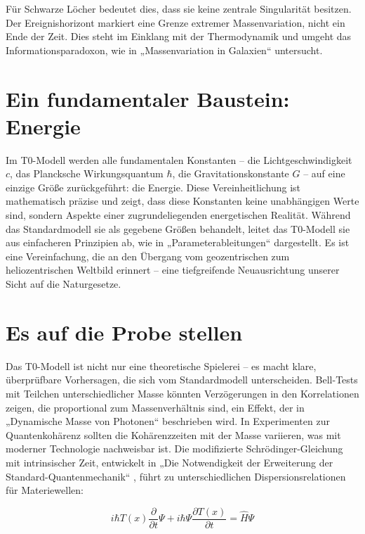 \documentclass[a4paper,12pt]{article}
\newcommand{\Tfield}{T(x)}
\begin{document}
	Für Schwarze Löcher bedeutet dies, dass sie keine zentrale Singularität besitzen. Der Ereignishorizont markiert eine Grenze extremer Massenvariation, nicht ein Ende der Zeit. Dies steht im Einklang mit der Thermodynamik und umgeht das Informationsparadoxon, wie in „Massenvariation in Galaxien“ \cite{pascher_galaxies_2025} untersucht.
	
	\section{Ein fundamentaler Baustein: Energie}
	
	Im T0-Modell werden alle fundamentalen Konstanten – die Lichtgeschwindigkeit \(c\), das Plancksche Wirkungsquantum \(\hbar\), die Gravitationskonstante \(G\) – auf eine einzige Größe zurückgeführt: die Energie. Diese Vereinheitlichung ist mathematisch präzise und zeigt, dass diese Konstanten keine unabhängigen Werte sind, sondern Aspekte einer zugrundeliegenden energetischen Realität. Während das Standardmodell sie als gegebene Größen behandelt, leitet das T0-Modell sie aus einfacheren Prinzipien ab, wie in „Parameterableitungen“ \cite{pascher_params_2025} dargestellt. Es ist eine Vereinfachung, die an den Übergang vom geozentrischen zum heliozentrischen Weltbild erinnert – eine tiefgreifende Neuausrichtung unserer Sicht auf die Naturgesetze.
	
	\section{Es auf die Probe stellen}
	
	Das T0-Modell ist nicht nur eine theoretische Spielerei – es macht klare, überprüfbare Vorhersagen, die sich vom Standardmodell unterscheiden. Bell-Tests mit Teilchen unterschiedlicher Masse könnten Verzögerungen in den Korrelationen zeigen, die proportional zum Massenverhältnis sind, ein Effekt, der in „Dynamische Masse von Photonen“ \cite{pascher_photons_2025} beschrieben wird. In Experimenten zur Quantenkohärenz sollten die Kohärenzzeiten mit der Masse variieren, was mit moderner Technologie nachweisbar ist. Die modifizierte Schrödinger-Gleichung mit intrinsischer Zeit, entwickelt in „Die Notwendigkeit der Erweiterung der Standard-Quantenmechanik“ \cite{pascher_quantum_2025}, führt zu unterschiedlichen Dispersionsrelationen für Materiewellen:
	
	\begin{equation}
		i\hbar \Tfield \frac{\partial}{\partial t} \Psi + i\hbar \Psi \frac{\partial \Tfield}{\partial t} = \hat{H} \Psi
	\end{equation}
	
\end{document}

